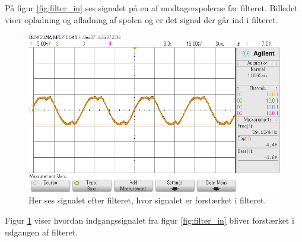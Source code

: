 På figur \ref{fig:filter_in} ses signalet på en af modtagerspolerne før filteret. 
Billedet viser opladning og afladning af spolen og er det signal der går ind i filteret. 
\begin{figure}[h!]
	\centering
	\includegraphics[width=1\textwidth]{billeder/filter_out_png.png}
	\caption{Her ses signalet efter filteret, hvor signalet er forstærket i filteret.}
	\label{fig:filter_out}
\end{figure}
\FloatBlock
Figur \ref{fig:filter_out} viser hvordan indgangssignalet fra figur \ref{fig:filter_in} bliver forstærket i udgangen af filteret.